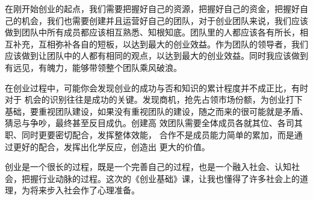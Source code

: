 \documentclass[UTF8]{ctexart}
\begin{document}
在刚开始创业的起点，我们需要把握好自己的资源，把握好自己的资金，把握好自己的机会，我们也需要创建并且运营好自己的团队，对于创业团队来说，我们应该做到团队中所有成员都应该相互熟悉、知根知底。团队里的人都应该各有所长，相互补充，互相弥补各自的短板，以达到最大的创业效益。作为团队的领导者，我们应该做到让团队中的人都有相同的观点，以达到最大的创业效益。同时我应该做到有远见，有魄力，能够带领整个团队乘风破浪。

在创业过程中，可能你会发现创业的成功与否和知识的累计程度并不成正比，有时对于
机会的识别往往是成功的关键。发现商机，抢先占领市场份额，为创业打下基础，要重视团队建设，如果没有重视团队的建设，随之而来的很可能就是矛盾、猜忌与争吵，最终甚至反目成仇。创建高
效团队需要全体成员各就其位、各司其职、同时更要密切配合，发挥整体效能，
合作不是成员能力简单的累加，而是通过更好的配合，发挥出化学反应，创造出
更大的价值。  

创业是一个很长的过程，既是一个完善自己的过程，也是一个融入社会、认知社会，把握行业动脉的过程。这次的《创业基础》课，让我也懂得了许多社会上的道理，为将来步入社会作了心理准备。
\end{document}
